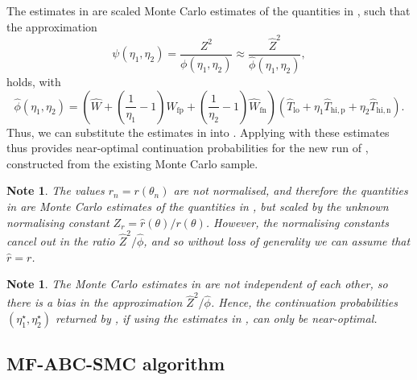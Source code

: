 \documentclass[12pt, onecolumn]{article}
\newcommand{\fp}[1]{#1_{\mathrm{fp}}}
\newcommand{\fn}[1]{#1_{\mathrm{fn}}}
\newtheorem{note}[theorem]{Note}
\begin{document}
The estimates in  are scaled Monte Carlo estimates of the quantities in , such that the approximation
\[
\psi(\eta_1,\eta_2) = \frac{Z^2}{\phi(\eta_1,\eta_2)} \approx \frac{\hat Z^2}{\hat \phi(\eta_1,\eta_2)},
\]
holds, with
\begin{equation}
\label{eq:PhiHat}
\hat \phi(\eta_1, \eta_2) = 
\left(  \hat W + \left( \frac{1}{\eta_1} - 1 \right) \fp{\hat W} + \left( \frac{1}{\eta_2} - 1 \right) \fn{\hat W} \right)
\left( \hat{T}_{\mathrm{lo}}
 + \eta_1 \hat T_{\mathrm{hi}, \mathrm p}
 + \eta_2 \hat T_{\mathrm{hi}, \mathrm n} \right).
\end{equation}
Thus, we can substitute the estimates in  into .
Applying  with these estimates thus provides near-optimal continuation probabilities for the new run of , constructed from the existing Monte Carlo sample.

\begin{note}
The values $r_n = r(\theta_n)$ are not normalised, and therefore the quantities in  are Monte Carlo estimates of the quantities in , but scaled by the unknown normalising constant $Z_r = \hat r(\theta)/r(\theta)$.
However, the normalising constants cancel out in the ratio $\hat Z^2/\hat \phi$, and so without loss of generality we can assume that $\hat r = r$.
\end{note}

\begin{note}
The Monte Carlo estimates in  are not independent of each other, so there is a bias in the approximation $\hat Z^2 / \hat \phi$.
Hence, the continuation probabilities $(\eta_1^\star, \eta_2^\star)$ returned by , if using the estimates in , can only be near-optimal. 
\end{note}


\subsection{MF-ABC-SMC algorithm}
\label{s:MFABC:SMC}
\end{document}
